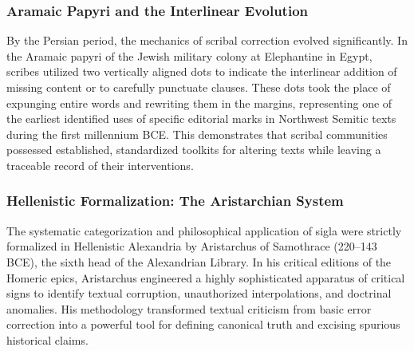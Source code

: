 \documentclass[aps,prd,11pt,onecolumn,superscriptaddress,nofootinbib,floatfix]{revtex4-2}
\begin{document}
\subsubsection{Aramaic Papyri and the Interlinear Evolution}
By the Persian period, the mechanics of scribal correction evolved significantly. In the Aramaic papyri of the Jewish military colony at Elephantine in Egypt, scribes utilized two vertically aligned dots to indicate the interlinear addition of missing content or to carefully punctuate clauses. These dots took the place of expunging entire words and rewriting them in the margins, representing one of the earliest identified uses of specific editorial marks in Northwest Semitic texts during the first millennium BCE. This demonstrates that scribal communities possessed established, standardized toolkits for altering texts while leaving a traceable record of their interventions.


\subsubsection{Hellenistic Formalization: The Aristarchian System}
The systematic categorization and philosophical application of sigla were strictly formalized in Hellenistic Alexandria by Aristarchus of Samothrace (220–143 BCE), the sixth head of the Alexandrian Library. In his critical editions of the Homeric epics, Aristarchus engineered a highly sophisticated apparatus of critical signs to identify textual corruption, unauthorized interpolations, and doctrinal anomalies. His methodology transformed textual criticism from basic error correction into a powerful tool for defining canonical truth and excising spurious historical claims.
\end{document}
